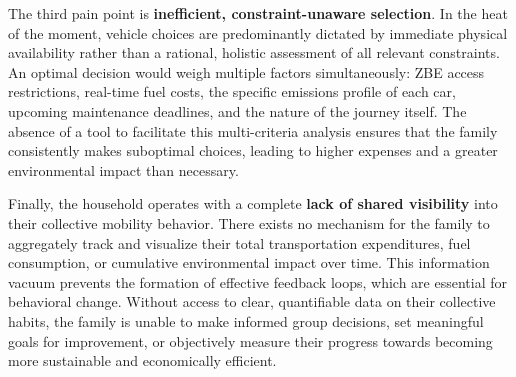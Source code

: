 \textgap

The third pain point is \textbf{inefficient, constraint-unaware selection}. In the heat of the moment, vehicle choices are predominantly dictated by immediate physical availability rather than a rational, holistic assessment of all relevant constraints. An optimal decision would weigh multiple factors simultaneously: ZBE access restrictions, real-time fuel costs, the specific emissions profile of each car, upcoming maintenance deadlines, and the nature of the journey itself. The absence of a tool to facilitate this multi-criteria analysis ensures that the family consistently makes suboptimal choices, leading to higher expenses and a greater environmental impact than necessary.

\textgap

Finally, the household operates with a complete \textbf{lack of shared visibility} into their collective mobility behavior. There exists no mechanism for the family to aggregately track and visualize their total transportation expenditures, fuel consumption, or cumulative environmental impact over time. This information vacuum prevents the formation of effective feedback loops, which are essential for behavioral change. Without access to clear, quantifiable data on their collective habits, the family is unable to make informed group decisions, set meaningful goals for improvement, or objectively measure their progress towards becoming more sustainable and economically efficient.
